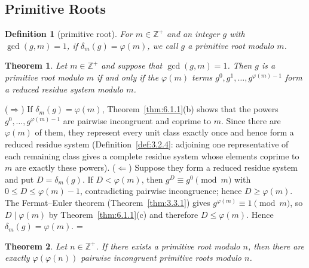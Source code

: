 \documentclass[11pt]{article}
\makeatletter
\theoremstyle{ntstyle}
\newtheorem{theorem}{Theorem}[subsection]
\newtheorem{definition}{Definition}[subsection]
\let\nt@closedisplay\]
\def\nt@guardedclose{\@ifnextchar\par{\nt@closeafterpar}{\@ifnextchar\end{\postdisplaypenalty\@M\nt@closedisplay}{\nt@closedisplay}}}
\def\nt@closeafterpar\par{\@ifnextchar\par{\nt@closeafterpar}{\@ifnextchar\end{\postdisplaypenalty\@M\nt@closedisplay\par}{\nt@closedisplay\par}}}
\renewenvironment{proof}[1][\proofname]{\par
  \pushQED{\qed}\normalfont\topsep\medskipamount\edef\nt@afterproof{\@endparpenalty=\the\@endparpenalty\relax}\@beginparpenalty\@M\@endparpenalty\@M\let\]\nt@guardedclose\trivlist\item[]\textit{#1\@addpunct{.}} \ignorespaces}{\ifvmode\addpenalty\@M\fi\popQED\nt@afterproof\endtrivlist\@endpefalse}
\makeatother
\begin{document}
\subsection{Primitive Roots}

\begin{definition}[primitive root]\label{def:6.2.1} For $m \in
		\mathbb{Z}^+$ and an integer $g$ with $\gcd(g, m) = 1$, if $\delta_m(g) =
		\varphi(m)$, we call $g$ a primitive root modulo $m$.
\end{definition}
\begin{theorem}\label{thm:6.2.1} Let $m \in \mathbb{Z}^+$ and
	suppose that $\gcd(g, m) = 1$. Then $g$ is a primitive root modulo $m$ if and only
	if the $\varphi(m)$ terms $g^{0}, g^{1}, \ldots, g^{\varphi(m) - 1}$
	form a reduced residue system modulo $m$.
\end{theorem}

\begin{proof} ($\Rightarrow$) If $\delta_m(g) =
		\varphi(m)$, Theorem~\ref{thm:6.1.1}(b) shows that the powers $g^{0}, \ldots,
		g^{\varphi(m) - 1}$ are pairwise incongruent and coprime to $m$. Since there are
	$\varphi(m)$ of them, they represent every unit class exactly once and
	hence form a reduced residue system (Definition~\ref{def:3.2.4}: adjoining one representative of each
	remaining class gives a complete residue system whose elements coprime to $m$ are exactly these powers).
	($\Leftarrow$) Suppose they form a reduced residue system and put $D =
		\delta_m(g)$. If $D < \varphi(m)$, then $g^{D} \equiv g^{0} \pmod{m}$
	with $0 \le D \le \varphi(m) - 1$, contradicting pairwise
	incongruence; hence $D \ge \varphi(m)$. The Fermat--Euler theorem (Theorem~\ref{thm:3.3.1}) gives
	$g^{\varphi(m)} \equiv 1 \pmod{m}$, so $D \mid \varphi(m)$ by Theorem~\ref{thm:6.1.1}(c) and
	therefore $D \le \varphi(m)$. Hence $\delta_m(g) =
		\varphi(m)$.
\end{proof}
\begin{theorem}\label{thm:6.2.2} Let $n\in\mathbb{Z}^+$. If there exists a primitive root
	modulo $n$, then there are exactly $\varphi(\varphi(n))$ pairwise
	incongruent primitive roots modulo $n$.
\end{theorem}
\end{document}
